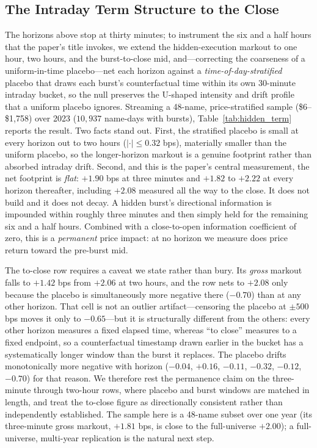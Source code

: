 \documentclass[11pt]{article}
\begin{document}
\subsection{The Intraday Term Structure to the Close}
\label{sec:termstructure}
The horizons above stop at thirty minutes; to instrument the six and a half hours that the paper's title invokes, we extend the hidden-execution markout to one hour, two hours, and the burst-to-close mid, and---correcting the coarseness of a uniform-in-time placebo---net each horizon against a \emph{time-of-day-stratified} placebo that draws each burst's counterfactual time within its own 30-minute intraday bucket, so the null preserves the U-shaped intensity and drift profile that a uniform placebo ignores. Streaming a 48-name, price-stratified sample (\$6--\$1{,}758) over 2023 ($10{,}937$ name-days with bursts), Table~\ref{tab:hidden_term} reports the result. Two facts stand out. First, the stratified placebo is small at every horizon out to two hours ($|\cdot|\le0.32$ bps), materially smaller than the uniform placebo, so the longer-horizon markout is a genuine footprint rather than absorbed intraday drift. Second, and this is the paper's central measurement, the net footprint is \emph{flat}: $+1.90$ bps at three minutes and $+1.82$ to $+2.22$ at every horizon thereafter, including $+2.08$ measured all the way to the close. It does not build and it does not decay. A hidden burst's directional information is impounded within roughly three minutes and then simply held for the remaining six and a half hours. Combined with a close-to-open information coefficient of zero, this is a \emph{permanent} price impact: at no horizon we measure does price return toward the pre-burst mid.

The to-close row requires a caveat we state rather than bury. Its \emph{gross} markout falls to $+1.42$ bps from $+2.06$ at two hours, and the row nets to $+2.08$ only because the placebo is simultaneously more negative there ($-0.70$) than at any other horizon. That cell is not an outlier artifact---censoring the placebo at $\pm500$ bps moves it only to $-0.65$---but it is structurally different from the others: every other horizon measures a fixed elapsed time, whereas ``to close'' measures to a fixed endpoint, so a counterfactual timestamp drawn earlier in the bucket has a systematically longer window than the burst it replaces. The placebo drifts monotonically more negative with horizon ($-0.04$, $+0.16$, $-0.11$, $-0.32$, $-0.12$, $-0.70$) for that reason. We therefore rest the permanence claim on the three-minute through two-hour rows, where placebo and burst windows are matched in length, and treat the to-close figure as directionally consistent rather than independently established. The sample here is a 48-name subset over one year (its three-minute gross markout, $+1.81$ bps, is close to the full-universe $+2.00$); a full-universe, multi-year replication is the natural next step.
\end{document}

